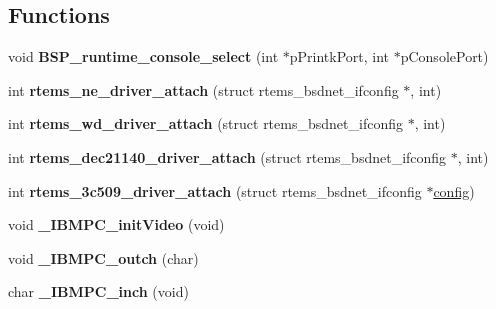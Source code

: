 \subsection*{Functions}
\begin{DoxyCompactItemize}
\item 
\mbox{\label{group__RTEMSBSPsI386_gaabcc1940ae7a48d540dd1b8c591abd94}} 
void {\bfseries B\+S\+P\+\_\+runtime\+\_\+console\+\_\+select} (int $\ast$p\+Printk\+Port, int $\ast$p\+Console\+Port)
\item 
\mbox{\label{group__RTEMSBSPsI386_ga6833c75050361282cf7094c83bce1e8d}} 
int {\bfseries rtems\+\_\+ne\+\_\+driver\+\_\+attach} (struct rtems\+\_\+bsdnet\+\_\+ifconfig $\ast$, int)
\item 
\mbox{\label{group__RTEMSBSPsI386_gae0c51747e5dbedbd9d4fa769512866a9}} 
int {\bfseries rtems\+\_\+wd\+\_\+driver\+\_\+attach} (struct rtems\+\_\+bsdnet\+\_\+ifconfig $\ast$, int)
\item 
\mbox{\label{group__RTEMSBSPsI386_ga2d4c8e1b3fb93487a190caabbba73f0b}} 
int {\bfseries rtems\+\_\+dec21140\+\_\+driver\+\_\+attach} (struct rtems\+\_\+bsdnet\+\_\+ifconfig $\ast$, int)
\item 
\mbox{\label{group__RTEMSBSPsI386_gac4ea86115cd16199a1f9f544c98a59b0}} 
int {\bfseries rtems\+\_\+3c509\+\_\+driver\+\_\+attach} (struct rtems\+\_\+bsdnet\+\_\+ifconfig $\ast$\mbox{\hyperlink{structconfig__s}{config}})
\item 
\mbox{\label{group__RTEMSBSPsI386_ga13e7723abdb18c03ce9db6bb6a4f225e}} 
void {\bfseries \+\_\+\+I\+B\+M\+P\+C\+\_\+init\+Video} (void)
\item 
\mbox{\label{group__RTEMSBSPsI386_ga9a6bb126b63860ed2102d6459986d016}} 
void {\bfseries \+\_\+\+I\+B\+M\+P\+C\+\_\+outch} (char)
\item 
\mbox{\label{group__RTEMSBSPsI386_ga0c7b14aca63d46abe75b260eeec8c966}} 
char {\bfseries \+\_\+\+I\+B\+M\+P\+C\+\_\+inch} (void)
\item 
\mbox{\label{group__RTEMSBSPsI386_gad2e8ecae86a32f7da38908547e6c575c}} 

\end{DoxyCompactItemize}
